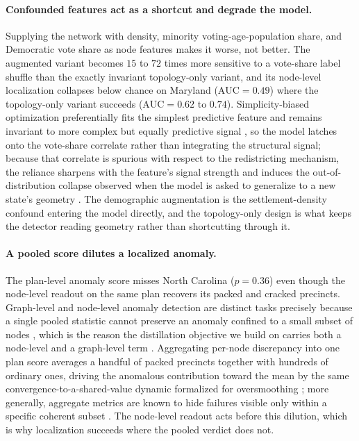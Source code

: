 \paragraph{Confounded features act as a shortcut and degrade the model.}
Supplying the network with density, minority voting-age-population share, and
Democratic vote share as node features makes it worse, not better. The
augmented variant becomes $15$ to $72$ times more sensitive to a vote-share
label shuffle than the exactly invariant topology-only variant, and its
node-level localization collapses below chance on Maryland ($\mathrm{AUC}=0.49$)
where the topology-only variant succeeds ($\mathrm{AUC}=0.62$ to $0.74$).
Simplicity-biased optimization preferentially fits the simplest predictive
feature and remains invariant to more complex but equally predictive signal
\cite{shah2020simplicity, geirhos2020shortcut}, so the model latches onto the
vote-share correlate rather than integrating the structural signal; because that
correlate is spurious with respect to the redistricting mechanism, the reliance
sharpens with the feature's signal strength \cite{sagawa2020overparameterization}
and induces the out-of-distribution collapse observed when the model is asked to
generalize to a new state's geometry \cite{sagawa2020distributionally,
nagarajan2021failure}. The demographic augmentation is the settlement-density
confound entering the model directly, and the topology-only design is what keeps
the detector reading geometry rather than shortcutting through it.

\paragraph{A pooled score dilutes a localized anomaly.}
The plan-level anomaly score misses North Carolina ($p=0.36$) even though the
node-level readout on the same plan recovers its packed and cracked precincts.
Graph-level and node-level anomaly detection are distinct tasks precisely
because a single pooled statistic cannot preserve an anomaly confined to a small
subset of nodes \cite{ma2023survey}, which is the reason the distillation
objective we build on carries both a node-level and a graph-level term
\cite{ma2021glocalkd}. Aggregating per-node discrepancy into one plan score
averages a handful of packed precincts together with hundreds of ordinary ones,
driving the anomalous contribution toward the mean by the same
convergence-to-a-shared-value dynamic formalized for oversmoothing
\cite{rusch2023oversmoothing}; more generally, aggregate metrics are known to
hide failures visible only within a specific coherent subset
\cite{salaudeen2025aggregation}. The node-level readout acts before this
dilution, which is why localization succeeds where the pooled verdict does not.

